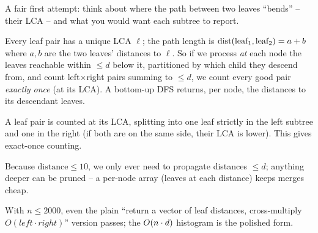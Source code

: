 \begin{attemptgate}
A fair first attempt: think about where the path between two leaves ``bends'' -- their LCA --
and what you would want each subtree to report.
\end{attemptgate}

Every leaf pair has a unique LCA $\ell$; the path length is $\operatorname{dist}(\text{leaf}_1,
\text{leaf}_2) = a + b$ where $a, b$ are the two leaves' distances to $\ell$. So if we
process \emph{at} each node the leaves reachable within $\le d$ below it, partitioned by which
child they descend from, and count left$\times$right pairs summing to $\le d$, we count every
good pair \emph{exactly once} (at its LCA). A bottom-up DFS returns, per node, the distances to
its descendant leaves.

\begin{observation}
A leaf pair is counted at its LCA, splitting into one leaf strictly in the left subtree and one
in the right (if both are on the same side, their LCA is lower). This gives exact-once counting.
\end{observation}
\begin{observation}
Because $\text{distance} \le 10$, we only ever need to propagate distances $\le d$; anything
deeper can be pruned -- a per-node array  (leaves at each distance) keeps
merges cheap.
\end{observation}
\begin{observation}
With $n \le 2000$, even the plain ``return a vector of leaf distances, cross-multiply $O(
\mathit{left}\cdot\mathit{right})$'' version passes; the $O(n\cdot d)$ histogram is the
polished form.
\end{observation}


